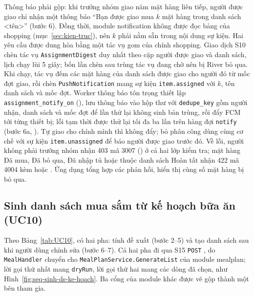 Thông báo phải gộp: khi trưởng nhóm giao năm mặt hàng liên tiếp, người được giao chỉ nhận một thông báo “Bạn được giao mua $k$ mặt hàng trong danh sách <tên>” (bước 6). Đồng thời, module notification không được đọc bảng của shopping (mục~\ref{sec:kien-truc}), nên $k$ phải nằm sẵn trong nội dung sự kiện. Hai yêu cầu được dung hòa bằng một tác vụ gom của chính shopping. Giao dịch S10 chèn tác vụ \texttt{AssignmentDigest} duy nhất theo cặp người được giao và danh sách, lịch chạy lùi 5 giây; bốn lần chèn sau trùng tác vụ đang chờ nên bị River bỏ qua. Khi chạy, tác vụ đếm các mặt hàng của danh sách được giao cho người đó từ mốc đợt giao, rồi chèn \texttt{PushNotification} mang sự kiện \texttt{item.assigned} với $k$, tên danh sách và mốc đợt. Worker thông báo tôn trọng thiết lập \texttt{assignment\_notify\_on} (), lưu thông báo vào hộp thư với \texttt{dedupe\_key} gồm người nhận, danh sách và mốc đợt để lần thử lại không sinh bản trùng, rồi đẩy FCM tới từng thiết bị; lỗi tạm thời được thử lại tối đa ba lần trên hàng đợi \texttt{notify} (bước 6a, ). Tự giao cho chính mình thì không đẩy; bỏ phân công dùng cùng cơ chế với sự kiện \texttt{item.unassigned} để báo người được giao trước đó. Về lỗi, người không phải trưởng nhóm nhận 403 mã 3007 () ở cả hai lớp kiểm tra; mặt hàng Đã mua, Đã bỏ qua, Đã nhập tủ hoặc thuộc danh sách Hoàn tất nhận 422 mã 4004 kèm  hoặc . Ứng dụng tổng hợp các phản hồi, hiển thị  cùng số mặt hàng bị bỏ qua.

\subsection{Sinh danh sách mua sắm từ kế hoạch bữa ăn (UC10)}\label{sssec:ht-sinh-ds}

Theo Bảng~\ref{tab:UC10},  có hai pha: tính đề xuất (bước 2--5) và tạo danh sách sau khi người dùng chỉnh sửa (bước 6--7). Cả hai pha đi qua S15 \texttt{POST} , do \texttt{MealHandler} chuyển cho \texttt{MealPlanService.GenerateList} của module mealplan; lời gọi thứ nhất mang \texttt{dryRun}, lời gọi thứ hai mang các dòng đã chọn, như Hình~\ref{fig:seq-sinh-ds-ke-hoach}. Ba cổng của module khác được vẽ gộp thành một bên tham gia.


